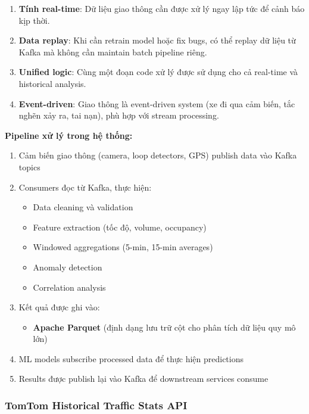 \begin{enumerate}
    \item \textbf{Tính real-time}: Dữ liệu giao thông cần được xử lý ngay lập tức để cảnh báo kịp thời.
    
    \item \textbf{Data replay}: Khi cần retrain model hoặc fix bugs, có thể replay dữ liệu từ Kafka mà không cần maintain batch pipeline riêng.
    
    \item \textbf{Unified logic}: Cùng một đoạn code xử lý được sử dụng cho cả real-time và historical analysis.
    
    \item \textbf{Event-driven}: Giao thông là event-driven system (xe đi qua cảm biến, tắc nghẽn xảy ra, tai nạn), phù hợp với stream processing.
\end{enumerate}

\textbf{Pipeline xử lý trong hệ thống:}

\begin{enumerate}
    \item Cảm biến giao thông (camera, loop detectors, GPS) publish data vào Kafka topics
    \item Consumers đọc từ Kafka, thực hiện:
    \begin{itemize}
        \item Data cleaning và validation
        \item Feature extraction (tốc độ, volume, occupancy)
        \item Windowed aggregations (5-min, 15-min averages)
        \item Anomaly detection
        \item Correlation analysis
    \end{itemize}
    \item Kết quả được ghi vào:
    \begin{itemize}
        \item \textbf{Apache Parquet} (định dạng lưu trữ cột cho phân tích dữ liệu quy mô lớn)
    \end{itemize}
    \item ML models subscribe processed data để thực hiện predictions
    \item Results được publish lại vào Kafka để downstream services consume
\end{enumerate}
\subsubsection{TomTom Historical Traffic Stats API}

